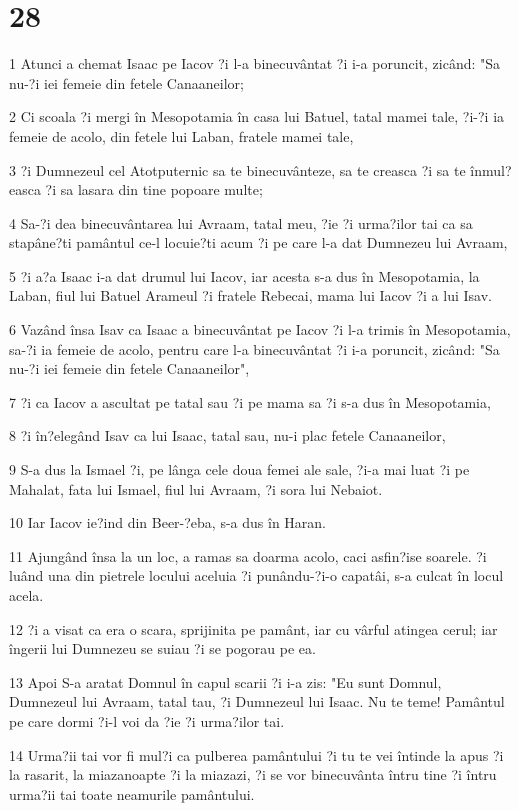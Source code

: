 \chapter{28}

\par 1 Atunci a chemat Isaac pe Iacov ?i l-a binecuvântat ?i i-a poruncit, zicând: "Sa nu-?i iei femeie din fetele Canaaneilor;
\par 2 Ci scoala ?i mergi în Mesopotamia în casa lui Batuel, tatal mamei tale, ?i-?i ia femeie de acolo, din fetele lui Laban, fratele mamei tale,
\par 3 ?i Dumnezeul cel Atotputernic sa te binecuvânteze, sa te creasca ?i sa te înmul?easca ?i sa lasara din tine popoare multe;
\par 4 Sa-?i dea binecuvântarea lui Avraam, tatal meu, ?ie ?i urma?ilor tai ca sa stapâne?ti pamântul ce-l locuie?ti acum ?i pe care l-a dat Dumnezeu lui Avraam,
\par 5 ?i a?a Isaac i-a dat drumul lui Iacov, iar acesta s-a dus în Mesopotamia, la Laban, fiul lui Batuel Arameul ?i fratele Rebecai, mama lui Iacov ?i a lui Isav.
\par 6 Vazând însa Isav ca Isaac a binecuvântat pe Iacov ?i l-a trimis în Mesopotamia, sa-?i ia femeie de acolo, pentru care l-a binecuvântat ?i i-a poruncit, zicând: "Sa nu-?i iei femeie din fetele Canaaneilor",
\par 7 ?i ca Iacov a ascultat pe tatal sau ?i pe mama sa ?i s-a dus în Mesopotamia,
\par 8 ?i în?elegând Isav ca lui Isaac, tatal sau, nu-i plac fetele Canaaneilor,
\par 9 S-a dus la Ismael ?i, pe lânga cele doua femei ale sale, ?i-a mai luat ?i pe Mahalat, fata lui Ismael, fiul lui Avraam, ?i sora lui Nebaiot.
\par 10 Iar Iacov ie?ind din Beer-?eba, s-a dus în Haran.
\par 11 Ajungând însa la un loc, a ramas sa doarma acolo, caci asfin?ise soarele. ?i luând una din pietrele locului aceluia ?i punându-?i-o capatâi, s-a culcat în locul acela.
\par 12 ?i a visat ca era o scara, sprijinita pe pamânt, iar cu vârful atingea cerul; iar îngerii lui Dumnezeu se suiau ?i se pogorau pe ea.
\par 13 Apoi S-a aratat Domnul în capul scarii ?i i-a zis: "Eu sunt Domnul, Dumnezeul lui Avraam, tatal tau, ?i Dumnezeul lui Isaac. Nu te teme! Pamântul pe care dormi ?i-l voi da ?ie ?i urma?ilor tai.
\par 14 Urma?ii tai vor fi mul?i ca pulberea pamântului ?i tu te vei întinde la apus ?i la rasarit, la miazanoapte ?i la miazazi, ?i se vor binecuvânta întru tine ?i întru urma?ii tai toate neamurile pamântului.
